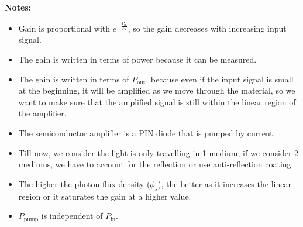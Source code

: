 \documentclass[11pt]{article}
\begin{document}
\textbf{Notes:}
\begin{itemize}
    \item Gain is proportional with $e^{-\frac{P_{\text{in}}}{P_s}}$, so the gain decreases with increasing input signal.
    \item The gain is written in terms of power because it can be measured.
    \item The gain is written in terms of ${P_{\text{out}}}$, because even if the input signal is small at the beginning, it will be amplified as we move through the material, so we want to make sure that the amplified signal is still within the linear region of the amplifier.
    \item The semiconductor amplifier is a PIN diode that is pumped by current.
    \item Till now, we consider the light is only travelling in 1 medium, if we consider 2 mediums, we have to account for the reflection or use anti-reflection coating.
    \item The higher the photon flux density ($\phi_s$), the better as it increases the linear region or it saturates the gain at a higher value.
    \item $P_{\text{pump}}$ is independent of $P_{\text{in}}$. 
\end{itemize}
\end{document}
